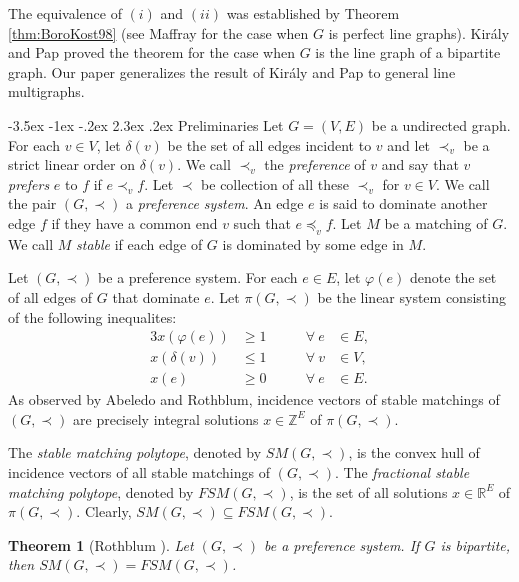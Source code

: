 \documentclass[11pt]{article}
\makeatletter
\newtheorem{theorem}{Theorem}%
\numberwithin{theorem}{section}
\renewcommand\section{%
  \@startsection{section}{1}
                {\z@}%
                {-3.5ex \@plus -1ex \@minus -.2ex}%
                {2.3ex \@plus.2ex}%
                {\large\bfseries}%
}
\makeatother
\begin{document}
The equivalence of $(i)$ and $(ii)$ was established by Theorem \ref{thm:BoroKost98} (see Maffray \cite{Maff92} for the case when $G$ is perfect line graphs). Kir\'{a}ly and Pap \cite{KiraPap08} proved the theorem for the case when $G$ is the line graph of a bipartite graph.	 Our paper generalizes the result of Kir\'{a}ly and Pap to general line multigraphs.


\section{Preliminaries}
\label{pre}
Let $G=(V,E)$ be a undirected graph. For each $v\in V$, let $\delta(v)$ be the set of all edges incident to $v$ and let $\prec_v$ be a strict linear order on $\delta(v)$. We call $\prec_v$ the \emph{preference} of $v$ and say that $v$ \emph{prefers} $e$ to $f$ if $e\prec_v f$. Let $\prec$ be collection of all these $\prec_v$ for $v\in V$. We call the pair $(G,\prec)$ a \emph{preference system}. An edge $e$ is said to dominate another edge $f$ if they have a common end $v$ such that $e\preceq_v f$. Let $M$ be a matching of $G$. We call $M$ \emph{stable} if each edge of $G$ is dominated by some edge in $M$.

Let $(G,\prec)$ be a preference system. For each $e\in E$, let $\varphi(e)$ denote the set of all edges of $G$ that dominate $e$. Let $\pi(G,\prec)$ be the linear system consisting of the following inequalites:
\begin{alignat}{3}
x(\varphi(e)) &\geq 1 &\qquad \forall ~e &\in E,\label{stability constraints}\\
x(\delta(v)) &\leq 1 &\qquad \forall ~v &\in V,\label{matching constraints}\\
x(e) &\geq 0 &\qquad \forall ~e &\in E.\label{edge nonnegativity}
\end{alignat}
As observed by Abeledo and Rothblum, incidence vectors of stable matchings of $(G,\prec)$ are precisely integral solutions $x\in \mathbb{Z}^E$ of $\pi(G,\prec)$.

The \textit{stable matching polytope}, denoted by $SM(G,\prec)$, is the convex hull of incidence vectors of all stable matchings of $(G,\prec)$. The \textit{fractional stable matching polytope}, denoted by $FSM(G,\prec)$, is the set of all solutions $x\in \mathbb{R}^E$ of $\pi(G,\prec)$. Clearly, $SM(G,\prec)\subseteq FSM(G,\prec)$. 

\begin{theorem}[Rothblum \cite{Roth92}]
\label{thm:Roth92}
Let $(G,\prec)$ be a preference system. If $G$ is bipartite, then
$SM(G,\prec)=FSM(G,\prec)$.
\end{theorem}
\end{document}
